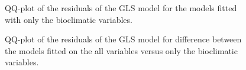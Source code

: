 \begin{figure}
\caption{\label{fig:ResidualGLSBio}QQ-plot of the residuals of the GLS model for the models fitted with only the bioclimatic variables.}
\end{figure}

\begin{figure}
\caption{\label{fig:ResidualGLSDiff}QQ-plot of the residuals of the GLS model for difference between the models fitted on the all variables versus only the bioclimatic variables.}
\end{figure}

